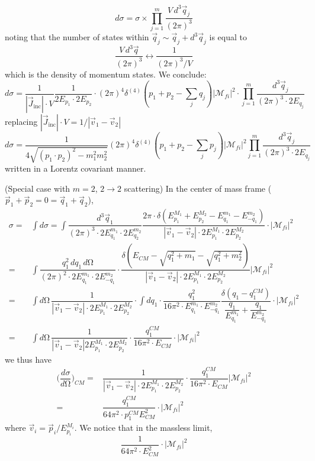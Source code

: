 \begin{defi}
\[d\sigma =\sigma \times \prod^{m}_{j=1}\dfrac{V\,d^3\vec{q}_{j}}{(2\pi )^3}\]
noting that the number of states within $\vec{q}_{j}\sim \vec{q}_{j}+d^3\vec{q}_{j}$ is equal to
\[\dfrac{V\,d^3\vec{q}}{(2\pi )^3}\leftrightarrow \dfrac{1}{(2\pi )^3/V}\]
which is the density of momentum states. We conclude:
\[d\sigma =\dfrac{1}{|\vec{J}_{\mathrm{inc}}|\cdot V}\dfrac{1}{2E_{p_1}\cdot 2E_{p_2}}\cdot (2\pi )^{4}\delta ^{(4)}(p_1+p_2-\sum _{j}q_{j})|\mathcal{M}_{fi}|^2\cdot \prod^{m}_{j=1}\dfrac{d^3\vec{q}_{j}}{(2\pi )^3\cdot 2E_{q_{j}}}\]
replacing $|\vec{J}_{\mathrm{inc}}|\cdot V=1/|\vec{v}_{1}-\vec{v}_{2}|$
\[d\sigma =\dfrac{1}{4\sqrt{(p_1\cdot p_2)^2-m_1^2m_2^2}}(2\pi )^{4}\delta ^{(4)}(p_1+p_2-\sum _{j}p_{j})|\mathcal{M}_{fi}|^2\prod^{m}_{j=1}\dfrac{d^3\vec{q}_{j}}{(2\pi )^3\cdot 2E_{q_{j}}}\]
written in a Lorentz covariant manner.
\end{defi}
\vspace{2ex}
\begin{ex}
(Special case with $m=2$, $2\rightarrow 2$ scattering) In the center of mass frame ($\vec{p}_{1}+\vec{p}_{2}=0=\vec{q}_{1}+\vec{q}_{2}$),
\[\begin{align*}
\sigma =&\int d\sigma =\int \dfrac{d^3\vec{q}_{1}}{(2\pi )^3\cdot 2E^{m_1}_{q_1}\cdot 2E^{m_2}_{q_{2}}}\dfrac{2\pi \cdot \delta (E_{p_1}^{M_1}+E_{p_2}^{M_2}-E_{q_{1}}^{m_1}-E_{-q_{1}}^{m_2})}{|\vec{v}_{1}-\vec{v}_{2}|\cdot 2E_{p_1}^{M_1}\cdot 2E_{p_2}^{M_2}}\cdot |\mathcal{M}_{fi}|^2\\
=&\int \dfrac{q_1^2\,dq_1\,d\mathrm{\Omega} }{(2\pi )^2\cdot 2E_{q_1}^{m_1}\cdot 2E_{-q_1}^{m_2}}\cdot \dfrac{\delta (E_{CM}-\sqrt{q_1^2+m_1}-\sqrt{q_1^2+m_2^2})}{|\vec{v}_{1}-\vec{v}_{2}|\cdot 2E_{p_1}^{M_1}\cdot 2E_{p_2}^{M_2}}|\mathcal{M}_{fi}|^2\\
=&\int d\mathrm{\Omega} \,\dfrac{1}{|\vec{v}_{1}-\vec{v}_{2}|\cdot 2E_{p_1}^{M_1}\cdot 2E_{p_2}^{M_2}}\cdot \int dq_{1}\cdot \dfrac{q_1^2}{16\pi ^2\cdot E_{q_1}^{m_1}\cdot E_{-q_1}^{m_2}}\dfrac{\delta (q_1-q_1^{CM})}{\dfrac{q_1}{E^{m_1}_{q_1}}+\dfrac{q_1}{E^{m_2}_{-q_1}}}\cdot |\mathcal{M}_{fi}|^2\\
=&\int d\mathrm{\Omega} \,\dfrac{1}{|\vec{v}_{1}-\vec{v}_{2}|2E_{p_1}^{M_1}\cdot 2E_{p_2}^{M_2}}\cdot \dfrac{q_1^{CM}}{16\pi ^2\cdot E_{CM}}\cdot |\mathcal{M}_{fi}|^2
\end{align*}\]
we thus have
\[\begin{align*}
\Big(\dfrac{d\sigma }{d\mathrm{\Omega} }\Big)_{CM}=&\dfrac{1}{|\vec{v}_{1}-\vec{v}_{2}|\cdot 2E_{p_1}^{M_1}\cdot 2E_{p_2}^{M_2}}\cdot \dfrac{q_1^{CM}}{16\pi ^2\cdot E_{CM}}|\mathcal{M}_{fi}|^2\\
=&\dfrac{q_1^{CM}}{64\pi ^2\cdot p_1^{CM}E_{CM}^2}\cdot |\mathcal{M}_{fi}|^2
\end{align*}\]
where $\vec{v}_{i}=\vec{p}_{i}/E^{M_{i}}_{p_{i}}$. We notice that in the massless limit,
\[\dfrac{1}{64\pi ^2\cdot E_{CM}^2}\cdot |\mathcal{M}_{fi}|^2\]
\end{ex}
